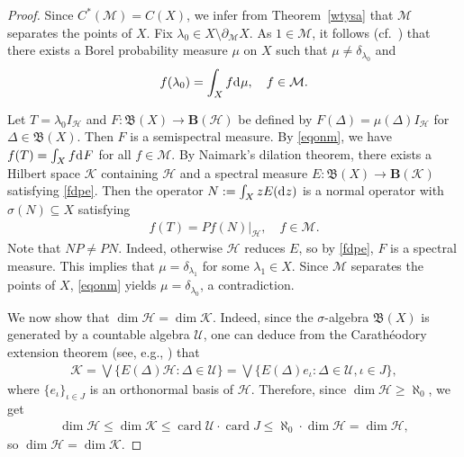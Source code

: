 \documentclass[reqno]{amsproc}
\DeclareMathOperator*{\card}{card}
\numberwithin{equation}{section}
\theoremstyle{remark}
\newcommand*{\uscr}{\mathscr{U}}
\newcommand*{\hh}{\mathcal{H}}
\newcommand*{\kk}{\mathcal{K}}
\newcommand*{\mcal}{\mathcal{M}}
\newcommand*{\borel}{\mathfrak{B}}
\newcommand*{\D}{\mathrm{d\hspace{.1ex}}}
\theoremstyle{definition}
\newcommand*{\Le}{\leqslant}
\newcommand*{\Ge}{\geqslant}
\newcommand*{\ogr}{\boldsymbol{B}}
\begin{document}
   \begin{proof}
Since $C^*(\mcal) = C(X)$, we infer from
Theorem~\ref{wtysa} that $\mcal$ separates the points
of $X$. Fix $\lambda_0 \in X
\setminus\partial_\mathcal{M}X$. As $1\in \mcal$, it
follows (cf.\ \cite[Proposition~6.2]{Phe02}) that
there exists a Borel probability measure $\mu$ on $X$
such that $\mu\neq \delta_{\lambda_0}$ and
   \begin{equation} \label{eqonm}
f(\lambda_0) = \int_X f\D \mu,\quad f\in
\mcal.
   \end{equation}

Let $T=\lambda_0 I_{\hh}$ and $F\colon \borel(X) \to
\ogr(\hh)$ be defined by
$F(\varDelta)=\mu(\varDelta)I_\hh$ for $\varDelta \in
\borel(X)$. Then $F$ is a semispectral measure. By
\eqref{eqonm}, we have $f(T) = \int_X f\D F$ for all
$f\in \mcal$. By Naimark's dilation theorem, there
exists a Hilbert space $\kk$ containing $\hh$ and a
spectral measure $E\colon \borel(X) \to \ogr(\kk)$
satisfying \eqref{fdpe}. Then the operator $N:=\int_X
z E(\D z)$ is a normal operator with $\sigma(N)
\subseteq X$ satisfying
   \begin{align} \label{dil}
f(T) = P f(N)|_{\hh}, \quad f\in \mcal.
   \end{align}
Note that $NP\neq PN$. Indeed, otherwise $\hh$ reduces
$E$, so by \eqref{fdpe}, $F$ is a spectral measure.
This implies that $\mu=\delta_{\lambda_1}$ for some
$\lambda_1 \in X$. Since $\mcal$ separates the points
of $X$, \eqref{eqonm} yields $\mu
=\delta_{\lambda_0}$, a contradiction.

We now show that $\dim \hh = \dim \kk$. Indeed, since
the $\sigma$-algebra $\borel(X)$ is generated by a
countable algebra $\uscr$, one can deduce from the
Carath\'{e}odory extension theorem (see, e.g.,
\cite[Appendix]{Sto87}) that
   \begin{align*}
\kk = \bigvee \Big\{E(\varDelta)\hh\colon
\varDelta \in \uscr\Big\} = \bigvee
\Big\{E(\varDelta)e_{\iota}\colon \varDelta
\in \uscr, \iota \in J\Big\},
   \end{align*}
where $\{e_{\iota}\}_{\iota\in J}$ is an
orthonormal basis of $\hh$. Therefore, since
$\dim \hh \Ge \aleph_0$, we get
   \begin{align*}
\dim \hh \Le \dim \kk \Le \card \uscr \cdot
\card J \Le \aleph_0 \cdot \dim \hh = \dim
\hh,
   \end{align*}
so $\dim \hh = \dim \kk$.


\end{proof}
\end{document}
